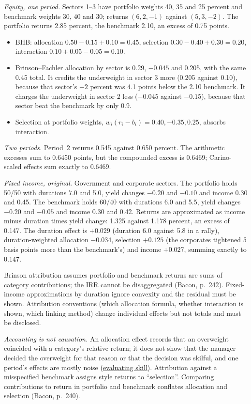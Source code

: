 \begin{qfmethod}
 \emph{Equity, one period.} Sectors 1--3 have portfolio weights 40, 35 and 25 percent and benchmark weights 30, 40 and 30; returns $(6,2,-1)$ against $(5,3,-2)$. The portfolio returns 2.85 percent, the benchmark 2.10, an excess of 0.75 points.
\begin{itemize}
\item BHB: allocation $0.50-0.15+0.10=0.45$, selection $0.30-0.40+0.30=0.20$, interaction $0.10+0.05-0.05=0.10$.
\item Brinson--Fachler allocation by sector is 0.29, $-0.045$ and 0.205, with the same 0.45 total. It credits the underweight in sector 3 more (0.205 against 0.10), because that sector's $-2$ percent was 4.1 points below the 2.10 benchmark. It charges the underweight in sector 2 less ($-0.045$ against $-0.15$), because that sector beat the benchmark by only 0.9.
\item Selection at portfolio weights, $w_i(r_i-b_i)=0.40,-0.35,0.25$, absorbs interaction.
\end{itemize}
\emph{Two periods.} Period~2 returns 0.545 against 0.650 percent. The arithmetic excesses sum to 0.6450 points, but the compounded excess is 0.6469; Carino-scaled effects sum exactly to 0.6469.

\emph{Fixed income, original.} Government and corporate sectors. The portfolio holds 50/50 with durations 7.0 and 5.0, yield changes $-0.20$ and $-0.10$ and income 0.30 and 0.45. The benchmark holds 60/40 with durations 6.0 and 5.5, yield changes $-0.20$ and $-0.05$ and income 0.30 and 0.42. Returns are approximated as income minus duration times yield change: 1.325 against 1.178 percent, an excess of 0.147. The duration effect is $+0.029$ (duration 6.0 against 5.8 in a rally), duration-weighted allocation $-0.034$, selection $+0.125$ (the corporates tightened 5 basis points more than the benchmark's) and income $+0.027$, summing exactly to 0.147.

 Brinson attribution assumes portfolio and benchmark returns are sums of category contributions; the IRR cannot be disaggregated (Bacon, p.~242). Fixed-income approximations by duration ignore convexity and the residual must be shown. Attribution conventions (which allocation formula, whether interaction is shown, which linking method) change individual effects but not totals and must be disclosed.

 \emph{Accounting is not causation.} An allocation effect records that an overweight coincided with a category's relative return; it does not show that the manager decided the overweight for that reason or that the decision was skilful, and one period's effects are mostly noise (\hyperref[meth:manager-skill-evaluation]{evaluating skill}). Attribution against a misspecified benchmark assigns style returns to ``selection''. Comparing contributions to return in portfolio and benchmark conflates allocation and selection (Bacon, p.~240).


\end{qfmethod}
